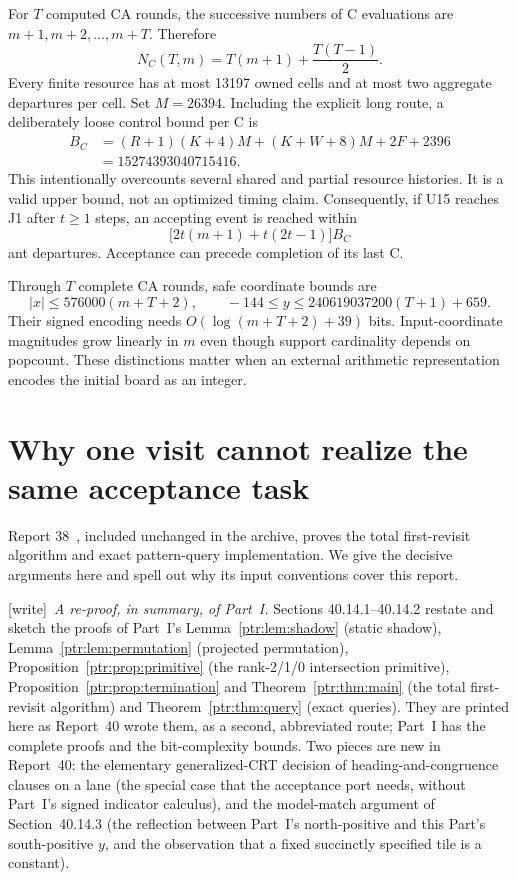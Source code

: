 \documentclass[11pt,letterpaper]{article}
\theoremstyle{definition}\newtheorem{definition}[theorem]{Definition}
\theoremstyle{remark}\newtheorem{remark}[theorem]{Remark}
\newcommand{\wtag}{\textup{[write]}}
\begin{document}
For $T$ computed CA rounds, the successive numbers of C evaluations are $m+1,m+2,\ldots,m+T$. Therefore
\begin{equation}\label{ptr:la:eq:evaluations}
 N_C(T,m)=T(m+1)+\frac{T(T-1)}2.
\end{equation}
Every finite resource has at most 13197 owned cells and at most two aggregate departures per cell. Set $M=26394$. Including the explicit long route, a deliberately loose control bound per C is
\begin{equation}\label{ptr:la:eq:microsteps}
\begin{split}
 B_C&=(R+1)(K+4)M+(K+W+8)M+2F+2396\\
 &=15274393040715416.
\end{split}
\end{equation}
This intentionally overcounts several shared and partial resource histories. It is a valid upper bound, not an optimized timing claim. Consequently, if U15 reaches J1 after $t\ge1$ steps, an accepting event is reached within
\begin{equation}\label{ptr:la:eq:halttime}
 \bigl[2t(m+1)+t(2t-1)\bigr]B_C
\end{equation}
ant departures. Acceptance can precede completion of its last C.

Through $T$ complete CA rounds, safe coordinate bounds are
\[
 |x|\le576000(m+T+2),\qquad
 -144\le y\le240619037200(T+1)+659.
\]
Their signed encoding needs $O(\log(m+T+2)+39)$ bits. Input-coordinate magnitudes grow linearly in $m$ even though support cardinality depends on popcount. These distinctions matter when an external arithmetic representation encodes the initial board as an integer.

\section{Why one visit cannot realize the same acceptance task}\label{ptr:la:sec:lower}
Report 38~\cite{ptr:la:report38}, included unchanged in the archive, proves the total first-revisit algorithm and exact pattern-query implementation. We give the decisive arguments here and spell out why its input conventions cover this report.

{\small\wtag\ \emph{A re-proof, in summary, of Part~I.} Sections 40.14.1--40.14.2
restate and sketch the proofs of Part~I's Lemma~\ref{ptr:lem:shadow} (static
shadow), Lemma~\ref{ptr:lem:permutation} (projected permutation),
Proposition~\ref{ptr:prop:primitive} (the rank-2/1/0 intersection primitive),
Proposition~\ref{ptr:prop:termination} and Theorem~\ref{ptr:thm:main} (the
total first-revisit algorithm) and Theorem~\ref{ptr:thm:query} (exact
queries). They are printed here as Report~40 wrote them, as a second,
abbreviated route; Part~I has the complete proofs and the bit-complexity
bounds. Two pieces are new in Report~40: the elementary generalized-CRT
decision of heading-and-congruence clauses on a lane (the special case that
the acceptance port needs, without Part~I's signed indicator calculus), and
the model-match argument of Section~40.14.3 (the reflection between Part~I's
north-positive and this Part's south-positive $y$, and the observation that a
fixed succinctly specified tile is a constant).\par}
\end{document}
